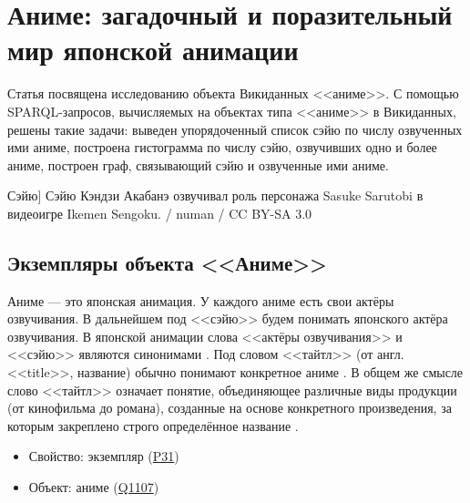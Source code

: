 
\chapter{Аниме: загадочный и поразительный мир японской анимации}
Статья посвящена исследованию объекта Викиданных <<аниме>>. С помощью SPARQL-запросов, вычисляемых на объектах типа <<аниме>>
в Викиданных, решены такие задачи: выведен упорядоченный список сэйю по числу озвученных ими аниме, построена гистограмма по числу сэйю, озвучивших одно и более аниме, построен граф, связывающий сэйю и озвученные ими аниме. 


\begin{marginfigure}[0.0cm]
{
	\setlength{\fboxsep}{0pt}%
	\setlength{\fboxrule}{1pt}%
}
\caption
[Сэйю]
{
Сэйю Кэндзи Акабанэ озвучивал роль персонажа Sasuke Sarutobi в видеоигре Ikemen Sengoku. / numan / CC BY-SA 3.0
}
\label{fig:seyu}
\end{marginfigure}

\label{ch:anime}

\section{Экземпляры объекта <<Аниме>>}

Аниме — это японская анимация. У каждого аниме есть свои актёры озвучивания. В дальнейшем под <<сэйю>> будем понимать японского актёра озвучивания. В японской анимации слова <<актёры озвучивания>> и <<сэйю>> являются синонимами \cite{seiyu_def}. Под словом <<тайтл>> (от англ. <<title>>, название) обычно понимают конкретное аниме \cite{anime_social}. В общем же смысле слово <<тайтл>> означает понятие, объединяющее различные виды продукции (от кинофильма до романа), созданные на основе конкретного произведения, за которым закреплено строго определённое название \cite{anime_title_def}.

\begin{itemize}
	\item Свойство: экземпляр (\href{https://www.wikidata.org/wiki/Property:P31}{P31})
	\item Объект: аниме (\href{https://www.wikidata.org/wiki/Q1107}{Q1107})
\end{itemize}

